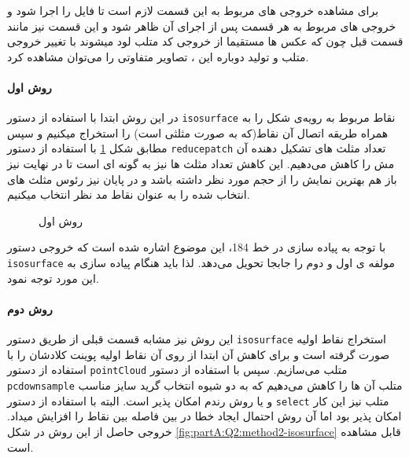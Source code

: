 \begin{note}
برای مشاهده خروجی های مربوط به این قسمت لازم است تا فایل 
را اجرا شود و خروجی های مربوط به هر قسمت پس از اجرای آن ظاهر شود و این قسمت نیز مانند قسمت قبل چون که عکس ها مستقیما از خروجی کد متلب لود میشوند با تغییر خروجی متلب و تولید دوباره این ، تصاویر متفاوتی را می‌توان مشاهده کرد.
\end{note}
\paragraph{روش اول}
 در این روش ابتدا با استفاده از دستور \texttt{isosurface} نقاط مربوط به رویه‌ی شکل را به همراه طریقه اتصال آن نقاط(که به صورت مثلثی است) را استخراج میکنیم و سپس مطابق شکل \ref{fig:partA:Q2:method1-isosurface}
 با استفاده از دستور \texttt{reducepatch} تعداد مثلث های تشکیل دهنده آن مش را کاهش می‌دهیم. این کاهش تعداد مثلث ها نیز به گونه ای است تا در نهایت نیز باز هم بهترین نمایش را از حجم مورد نظر داشته باشد و در پایان نیز رئوس مثلث های انتخاب شده را به عنوان نقاط مد نظر انتخاب میکنیم.



\begin{figure}[t!]
	\centering
	\removevspace
	\caption{روش اول}
	\label{fig:partA:Q2:method1-isosurface}
\end{figure}

\begin{note}
	با توجه به پیاده سازی  در \cite{fieldtrip-prepare_mesh_segmentation.m}
خط 184، این موضوع اشاره شده است که خروجی دستور \texttt{isosurface} مولفه ی اول و دوم را جابجا تحویل می‌دهد. لذا باید هنگام پیاده سازی به این مورد توجه نمود.
\end{note}

\paragraph{روش دوم}
این روش نیز مشابه قسمت قبلی از طریق دستور \texttt{isosurface}
استخراج نقاط اولیه صورت گرفته است و برای کاهش آن ابتدا از روی آن نقاط اولیه پوینت کلادشان را با استفاده از دستور \texttt{pointCloud} متلب می‌سازیم. سپس با استفاده از دستور \texttt{pcdownsample} متلب آن ها را کاهش می‌دهیم که به دو شیوه انتخاب گرید سایز مناسب و یا روش رندم امکان پذیر است. البته با استفاده از دستور \texttt{select} متلب نیز این کار امکان پذیر بود اما آن روش احتمال ایجاد خطا در بین فاصله بین نقاط را افزایش میداد. خروجی حاصل از این روش در شکل \ref{fig:partA:Q2:method2-isosurface} قابل مشاهده است.


